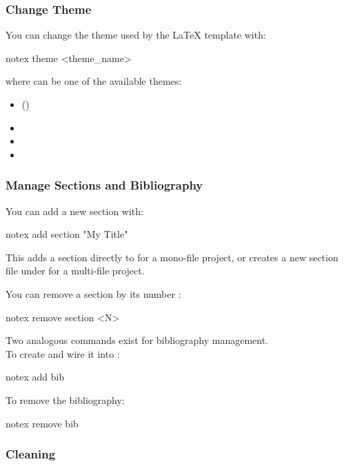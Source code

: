 \documentclass[../main.tex]{subfiles}
\begin{document}
\subsubsection{Change Theme}

You can change the theme used by the \LaTeX{} template with:

\begin{bash}
    notex theme <theme_name>
\end{bash}

where  can be one of the available themes:

\begin{itemize}
    \item {} ()
    \item {}
    \item {}
    \item {}
\end{itemize}

\subsubsection{Manage Sections and Bibliography}

You can add a new section with:

\begin{bash}
    notex add section "My Title"
\end{bash}

This adds a section directly to  for a mono-file project, or creates a new section file under  for a multi-file project.

You can remove a section by its number :

\begin{bash}
    notex remove section <N>
\end{bash}

Two analogous commands exist for bibliography management.\\
To create  and wire it into :

\begin{bash}
    notex add bib
\end{bash}

To remove the bibliography:

\begin{bash}
    notex remove bib
\end{bash}

\subsubsection{Cleaning}
\end{document}
